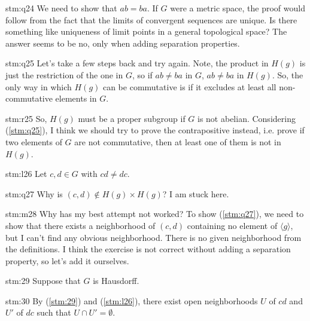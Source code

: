 \begin{explanation}{stm:q24}
We need to show that $ab = ba$. If $G$ were a metric space, the proof would follow from the fact that the limits of convergent sequences are unique. Is there something like uniqueness of limit points in a general topological space? The answer seems to be no, only when adding separation properties.
\end{explanation}

\begin{explanation}{stm:q25}
Let’s take a few steps back and try again. Note, the product in $H(g)$ is just the restriction of the one in $G$, so if $ab \ne ba$ in $G$, $ab \ne ba$ in $H(g)$. So, the only way in which $H(g)$ can be commutative is if it excludes at least all non-commutative elements in $G$.
\end{explanation}

\begin{explanation}{stm:r25}
So, $H(g)$ must be a proper subgroup if $G$ is not abelian. Considering (\ref{stm:q25}), I think we should try to prove the contrapositive instead, i.e. prove if two elements of $G$ are not commutative, then at least one of them is not in $H(g)$.
\end{explanation}

\begin{statement}{stm:l26}
  Let $c, d \in G$ with $cd \ne dc$.
\end{statement}

\begin{explanation}{stm:q27}
Why is $(c,d) \notin H(g) \times H(g)$? I am stuck here.
\end{explanation}

\begin{explanation}{stm:m28}
Why has my best attempt not worked? To show (\ref{stm:q27}), we need to show that there exists a neighborhood of $(c,d)$ containing no element of ${\langle g \rangle}$, but I can't find any obvious neighborhood. There is no given neighborhood from the definitions. I think the exercise is not correct without adding a separation property, so let's add it ourselves.
\end{explanation}

\begin{statement}{stm:29}
Suppose that $G$ is Hausdorff. 
\end{statement}

\begin{statement}{stm:30}
By (\ref{stm:29}) and (\ref{stm:l26}), there exist open neighborhoods $U$ of $cd$ and $U'$ of $dc$ such that $U \cap U' = \emptyset$.
\end{statement}

